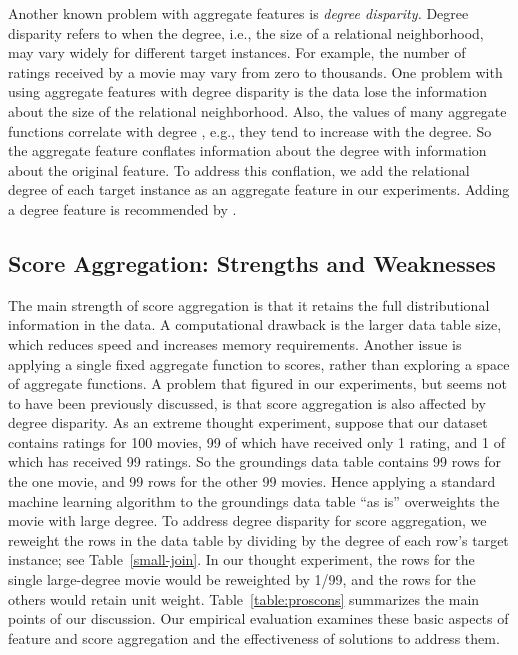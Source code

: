 \documentclass[conference]{IEEEtran}
\begin{document}
Another known problem with aggregate features is {\em degree disparity.} Degree disparity refers to when the degree, i.e., the size of a relational neighborhood, may vary widely for different target instances. For example, the number of ratings received by a movie may vary from zero to thousands. One problem with using aggregate features with degree disparity is the data lose the information about the size of the relational neighborhood. Also, the values of many aggregate functions correlate with degree \cite{Jensen2003}, e.g., they tend to increase with the degree. So the aggregate feature conflates information about the degree with information about the original feature. To address this conflation, we add the relational degree of each target instance as an aggregate feature in our experiments. Adding a degree feature is recommended by \cite{Jensen2003}.

\subsection{Score Aggregation: Strengths and Weaknesses} \label{sec:score-agg} The main strength of score aggregation is that it retains the full distributional information in the data. A computational drawback is the larger data table size, which reduces speed and increases memory requirements. Another issue is applying a single fixed aggregate function to scores, rather than exploring a space of aggregate functions. A problem that figured  in our experiments, but seems not to have been previously discussed, is that score aggregation is also affected by degree disparity. As an extreme thought experiment, suppose that our dataset contains ratings for 100 movies, 99 of which have received only 1 rating, and 1 of which has received 99 ratings. So the groundings data table contains 99 rows for the one movie, and 99 rows for the other 99 movies. Hence applying a standard machine learning algorithm to the groundings data table ``as is'' overweights the movie with large degree. To address degree disparity for score aggregation, we reweight the rows in the data table by dividing by the degree of each row's target instance; see Table~\ref{small-join}. In our thought experiment, the rows for the single large-degree movie would be reweighted by 1/99, and the rows for the others would retain unit weight. Table~\ref{table:proscons} summarizes the main points of our discussion.
Our empirical evaluation examines these basic aspects of feature and score aggregation and the effectiveness of solutions to address them.
\end{document}
